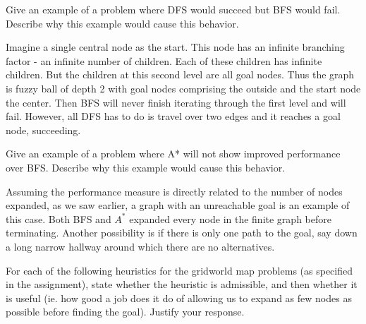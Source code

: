 \documentclass[12pt]{article}
\newenvironment{questionList}{
\newcounter{ctr}
\begin{list}{\textbf{Question \arabic{ctr}.} \\ \\ }
  {\usecounter{ctr}}
  }{
\end{list}
}
\begin{document}
\begin{questionList}
\item Give an example of a problem where DFS would succeed but BFS would fail.
Describe why this example would cause this behavior.

Imagine a single central node as the start. This node has an infinite branching factor - an infinite number of children. Each of these children has infinite children. But the children at this second level are all goal nodes. Thus the graph is fuzzy ball of depth 2 with goal nodes comprising the outside and the start node the center. Then BFS will never finish iterating through the first level and will fail. However, all DFS has to do is travel over two edges and it reaches a goal node, succeeding. 

\item Give an example of a problem where A* will not show improved performance
over BFS.  Describe why this example would cause this behavior.

Assuming the performance measure is directly related to the number of nodes expanded, as we saw earlier, a graph with an unreachable goal is an example of this case. Both BFS and $A^*$ expanded every node in the finite graph before terminating. Another possibility is if there is only one path to the goal, say down a long narrow hallway around which there are no alternatives. 

\item For each of the following heuristics for the gridworld map problems (as
specified in the assignment), state whether the heuristic is admissible, and
then whether it is useful (ie. how good a job does it do of allowing us to
expand as few nodes as possible before finding the goal).  Justify your response. 
\begin{itemize}
  

\end{itemize}
\end{questionList}
\end{document}
